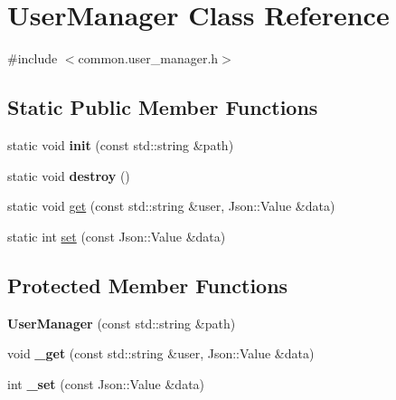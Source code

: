\hypertarget{classUserManager}{\section{User\-Manager Class Reference}
\label{classUserManager}
}


{\ttfamily \#include $<$common.\-user\-\_\-manager.\-h$>$}

\subsection*{Static Public Member Functions}
\begin{DoxyCompactItemize}
\item 
\hypertarget{classUserManager_a712e64b638d4586652bca563c19f427c}{static void {\bfseries init} (const std\-::string \&path)}\label{classUserManager_a712e64b638d4586652bca563c19f427c}

\item 
\hypertarget{classUserManager_aacdfb7ae91fee25bf7d61f047299396f}{static void {\bfseries destroy} ()}\label{classUserManager_aacdfb7ae91fee25bf7d61f047299396f}

\item 
static void \hyperlink{classUserManager_a42d338740bb3317751799a3e85b15903}{get} (const std\-::string \&user, Json\-::\-Value \&data)
\item 
static int \hyperlink{classUserManager_a78eee9121e7ceb88c18ec011391bd397}{set} (const Json\-::\-Value \&data)
\end{DoxyCompactItemize}
\subsection*{Protected Member Functions}
\begin{DoxyCompactItemize}
\item 
\hypertarget{classUserManager_a450ad78085c4462f149023559d7876eb}{{\bfseries User\-Manager} (const std\-::string \&path)}\label{classUserManager_a450ad78085c4462f149023559d7876eb}

\item 
\hypertarget{classUserManager_aecad336ff52d5121e6bdd61636a91f45}{void {\bfseries \-\_\-get} (const std\-::string \&user, Json\-::\-Value \&data)}\label{classUserManager_aecad336ff52d5121e6bdd61636a91f45}

\item 
\hypertarget{classUserManager_a3160806deccfc95412a275696ff57074}{int {\bfseries \-\_\-set} (const Json\-::\-Value \&data)}\label{classUserManager_a3160806deccfc95412a275696ff57074}

\end{DoxyCompactItemize}

